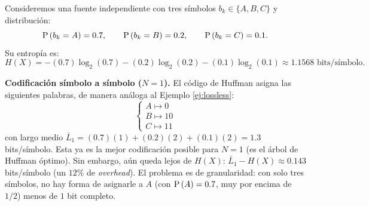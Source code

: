 \begin{ejemplo}\label{ej:bloques huffman}
Consideremos una fuente independiente con tres símbolos $b_k\in\{A,B,C\}$ y distribución:
\begin{equation*}
    \mathrm{P}\left(b_k=A\right)=0.7, \qquad \mathrm{P}\left(b_k=B\right)=0.2, \qquad \mathrm{P}\left(b_k=C\right)=0.1.
\end{equation*}
Su entropía es:
\begin{equation*}
    H(X) = -(0.7)\log_2(0.7) - (0.2)\log_2(0.2) - (0.1)\log_2(0.1) \approx 1.1568 \text{ bits/símbolo}.
\end{equation*}

\textbf{Codificación símbolo a símbolo ($N=1$).} El código de Huffman asigna las siguientes palabras, de manera análoga al Ejemplo \ref{ej:lossless}:
\begin{equation*}
    \begin{cases}
        A \mapsto 0\\
        B \mapsto 10\\
        C \mapsto 11
    \end{cases}
\end{equation*}
con largo medio $\bar{L}_1 = (0.7)(1)+(0.2)(2)+(0.1)(2) = 1.3$ bits/símbolo. Esta ya es la mejor codificación posible para $N=1$ (es el árbol de Huffman óptimo). Sin embargo, aún queda lejos de $H(X)$: $\bar{L}_1 - H(X)\approx 0.143$ bits/símbolo (un $12\%$ de \emph{overhead}). El problema es de granularidad: con solo tres símbolos, no hay forma de asignarle a $A$ (con $\mathrm{P}\left(A\right)=0.7$, muy por encima de $1/2$) menos de $1$ bit completo.


\end{ejemplo}
